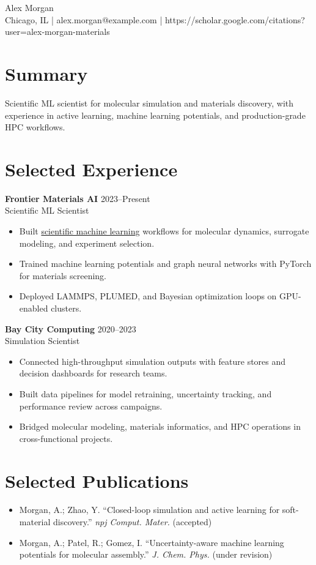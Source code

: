 \documentclass[10pt]{article}
\begin{document}
\begin{center}
  {\LARGE Alex Morgan}\\
  Chicago, IL \quad | \quad alex.morgan@example.com \quad | \quad
  https://scholar.google.com/citations?user=alex-morgan-materials
\end{center}

\section*{Summary}
Scientific ML scientist for molecular simulation and materials discovery, with experience in
active learning, machine learning potentials, and production-grade HPC workflows.

\section*{Selected Experience}
\textbf{Frontier Materials AI} \hfill 2023--Present\\
Scientific ML Scientist
\begin{itemize}
  \item Built \underline{scientific machine learning} workflows for molecular dynamics, surrogate modeling, and experiment selection.
  \item Trained machine learning potentials and graph neural networks with PyTorch for materials screening.
  \item Deployed LAMMPS, PLUMED, and Bayesian optimization loops on GPU-enabled clusters.
\end{itemize}

\textbf{Bay City Computing} \hfill 2020--2023\\
Simulation Scientist
\begin{itemize}
  \item Connected high-throughput simulation outputs with feature stores and decision dashboards for research teams.
  \item Built data pipelines for model retraining, uncertainty tracking, and performance review across campaigns.
  \item Bridged molecular modeling, materials informatics, and HPC operations in cross-functional projects.
\end{itemize}

\section*{Selected Publications}
\begin{itemize}
  \item Morgan, A.; Zhao, Y. ``Closed-loop simulation and active learning for soft-material discovery.'' \textit{npj Comput. Mater.} (accepted)
  \item Morgan, A.; Patel, R.; Gomez, I. ``Uncertainty-aware machine learning potentials for molecular assembly.'' \textit{J. Chem. Phys.} (under revision)
\end{itemize}
\end{document}
